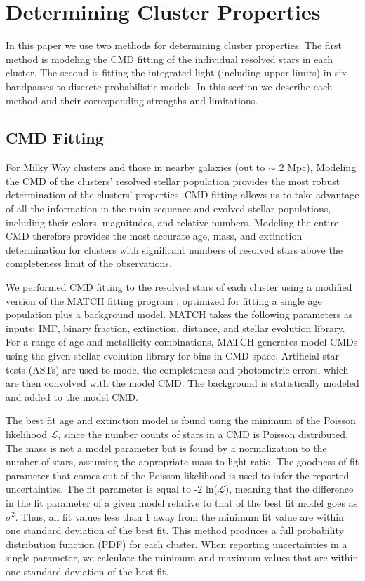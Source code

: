 \documentclass{emulateapj}
\begin{document}
\section{Determining Cluster Properties} \label{sec:properties}
In this paper we use two methods for determining cluster properties.  The first method is modeling the CMD fitting of the individual resolved stars in each cluster.  The second is fitting the integrated light (including upper limits) in six bandpasses to discrete probabilistic models.  In this section we describe each method and their corresponding strengths and limitations.

\subsection{CMD Fitting}\label{sec:cmd}
For Milky Way clusters and those in nearby galaxies (out to $\sim$ 2 Mpc), Modeling the CMD of the clusters' resolved stellar population provides the most robust determination of the clusters' properties.  CMD fitting allows us to take advantage of all the information in the main sequence and evolved stellar populations, including their colors, magnitudes, and relative numbers.  Modeling the entire CMD therefore provides the most accurate age, mass, and extinction determination for clusters with significant numbers of resolved stars above the completeness limit of the observations.
  
We performed CMD fitting to the resolved stars of each cluster using a modified version of the MATCH fitting program \citep{Dolphin02}, optimized for fitting a single age population plus a background model.  MATCH takes the following parameters as inputs:  IMF, binary fraction, extinction, distance, and stellar evolution library.  For a range of age and metallicity combinations, MATCH generates model CMDs using the given stellar evolution library for bins in CMD space.  Artificial star tests (ASTs) are used to model the completeness and photometric errors, which are then convolved with the model CMD.  The background is statistically modeled and added to the model CMD.  

The best fit age and extinction model is found using the minimum of the Poisson likelihood $\mathcal{L}$, since the number counts of stars in a CMD is Poisson distributed.  The mass is not a model parameter but is found by a normalization to the number of stars, assuming the appropriate mass-to-light ratio.  The goodness of fit parameter that comes out of the Poisson likelihood is used to infer the reported uncertainties.  The fit parameter is equal to -2 ln($\mathcal{L}$), meaning that the difference in the fit parameter of a given model relative to that of the best fit model goes as $\sigma^{2}$.  Thus, all fit values less than 1 away from the minimum fit value are within one standard deviation of the best fit.  This method produces a full probability distribution function (PDF) for each cluster.  When reporting uncertainties in a single parameter, we calculate the minimum and maximum values that are within one standard deviation of the best fit.
\end{document}

